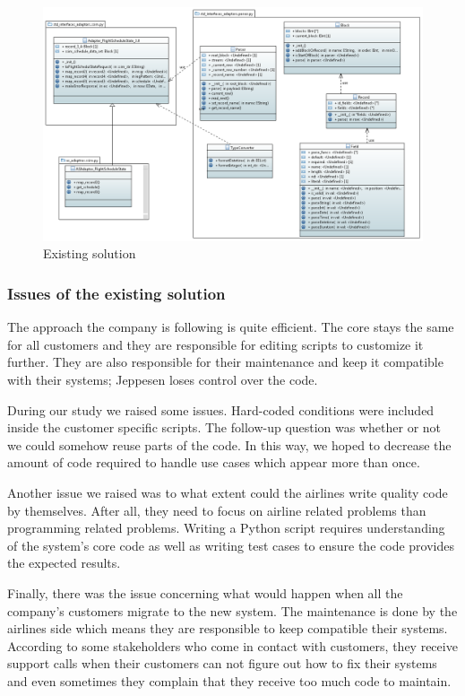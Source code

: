 \begin{figure}[h]
\centering
\includegraphics[width=1.0 \textwidth]{figure/figure8.png}

\caption{Existing solution}
\label{fig:classDiagram}
\end{figure}


\subsubsection{Issues of the existing solution}

The approach the company is following is quite efficient. The core stays the same for all customers and they are responsible for editing scripts to customize it further. They are also responsible for their maintenance and keep it compatible with their systems; Jeppesen loses control over the code. 

During our study we raised some issues. Hard-coded conditions were included inside the customer specific scripts. The follow-up question was whether or not we could somehow reuse parts of the code. In this way, we hoped to decrease the amount of code required to handle use cases which appear more than once.


Another issue we raised was to what extent could the airlines write quality code by themselves. After all, they need to focus on airline related problems than programming related problems. Writing a Python script requires understanding of the system's core code as well as writing test cases to ensure the code provides the expected results.


Finally, there was the issue concerning what would happen when all the company's customers migrate to the new system. The maintenance is done by the airlines side which means they are responsible to keep compatible their systems. 
According to some stakeholders who come in contact with customers, they receive support calls when their customers can not figure out how to fix their systems and even sometimes they complain that they receive too much code to maintain.  

